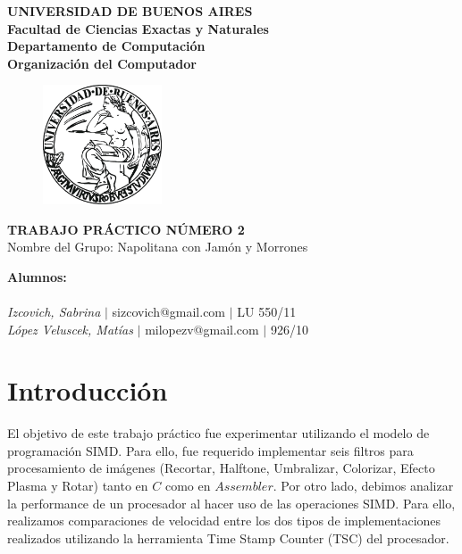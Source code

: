\documentclass[10pt, a4paper]{article}
\begin{document}
\thispagestyle{empty}
\begin{center}

\Huge{ \bf{UNIVERSIDAD DE BUENOS AIRES}}
\\
\LARGE{\bf{Facultad de Ciencias Exactas y Naturales}}
\\
\textbf{Departamento de Computaci\'on}
\\
\textbf{Organizaci\'on del Computador}
\vspace{2.0\baselineskip}
\end{center}


\begin{figure}[h] %
\begin{center}
\includegraphics[width=100pt]{./image.jpeg}
\end{center}
\end{figure}
\begin{center}
\vspace*{0.7cm}

\huge{\bf TRABAJO PR\'ACTICO N\'UMERO 2}\\
\huge{Nombre del Grupo: Napolitana con Jam\'on y Morrones}
\vspace*{7.5cm}

\end{center}

\huge{\textbf{Alumnos:}}\\
\\
\vspace*{0.3cm}
\Large{\textsl{Izcovich, Sabrina} $|$ sizcovich@gmail.com $|$ LU 550/11}\\
\vspace*{0.3cm}
\Large{\textsl{L\'opez Veluscek, Matías} \hspace{0.1cm}$|$ milopezv@gmail.com $|$ 926/10}\\
\vspace*{0.3cm}
\vspace{0.6cm}
 
\newpage
\thispagestyle{empty}
\tableofcontents
\newpage
\section{Introducci\'on}
El objetivo de este trabajo pr\'actico fue experimentar utilizando el modelo de programaci\'on SIMD. Para ello, fue requerido implementar seis filtros para procesamiento de im\'agenes (Recortar, Halftone, Umbralizar, Colorizar, Efecto Plasma y Rotar) tanto en $C$ como en $Assembler$.\newline
Por otro lado, debimos analizar la performance de un procesador al hacer uso de las operaciones SIMD. Para ello, realizamos comparaciones de velocidad entre los dos tipos de implementaciones realizados utilizando la herramienta Time Stamp Counter (TSC) del procesador.
\end{document}
